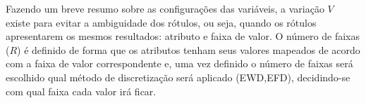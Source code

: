 Fazendo um breve resumo sobre as configurações das variáveis, a variação ${V}$ existe para evitar a ambiguidade dos rótulos, ou seja, quando os rótulos apresentarem os mesmos resultados: atributo e faixa de valor. O número de faixas (${R}$) é definido de forma que os atributos tenham seus valores mapeados de acordo com a faixa de valor correspondente e, uma vez definido o número de faixas será escolhido qual método de discretização será aplicado (EWD,EFD), decidindo-se com qual faixa cada valor irá ficar.










